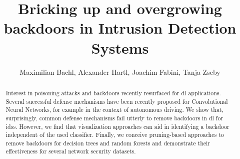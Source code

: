 \documentclass[10pt,sigconf,letterpaper,dvipsnames]{acmart}
\begin{document}
\title{Bricking up and overgrowing backdoors in Intrusion Detection Systems}



\begin{abstract}
Interest in poisoning attacks and backdoors recently resurfaced for \gls{dl} applications. Several successful defense mechanisms have been recently proposed for Convolutional Neural Networks, for example in the context of autonomous driving. We show that, surprisingly, common defense mechanisms fail utterly to remove backdoors in \gls{dl} for \glspl{ids}. However, we find that visualization approaches can aid in identifying a backdoor independent of the used classifier. Finally, we conceive pruning-based approaches to remove backdoors for decision trees and random forests and demonstrate their effectiveness for several network security datasets.
\end{abstract}

\author{Maximilian Bachl, Alexander Hartl, Joachim Fabini, Tanja Zseby}

\end{document}
